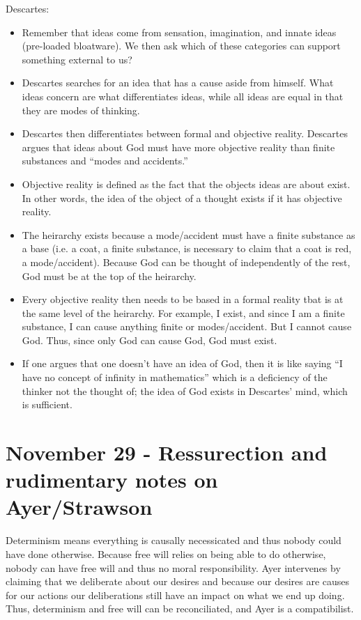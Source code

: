 \documentclass{report}
\begin{document}
Descartes:

\begin{itemize}
\item Remember that ideas come from sensation, imagination, and innate ideas (pre-loaded bloatware). We then ask which of these categories can support something external to us?
\item Descartes searches for an idea that has a cause aside from himself. What ideas concern are what differentiates ideas, while all ideas are equal in that they are modes of thinking.
\item Descartes then differentiates between formal and objective reality. Descartes argues that ideas about God must have more objective reality than finite substances and ``modes and accidents.''
\item Objective reality is defined as the fact that the objects ideas are about exist. In other words, the idea of the object of a thought exists if it has objective reality.
\item The heirarchy exists because a mode/accident must have a finite substance as a base (i.e. a coat, a finite substance, is necessary to claim that a coat is red, a mode/accident). Because God can be thought of independently of the rest, God must be at the top of the heirarchy.
\item Every objective reality then needs to be based in a formal reality tbat is at the same level of the heirarchy. For example, I exist, and since I am a finite substance, I can cause anything finite or modes/accident. But I cannot cause God. Thus, since only God can cause God, God must exist. 
\item If one argues that one doesn't have an idea of God, then it is like saying ``I have no concept of infinity in mathematics'' which is a deficiency of the thinker not the thought of; the idea of God exists in Descartes' mind, which is sufficient. 
\end{itemize}

\section{November 29 - Ressurection and rudimentary notes on Ayer/Strawson}

Determinism means everything is causally necessicated and thus nobody could have done otherwise. Because free will relies on being able to do otherwise, nobody can have free will and thus no moral responsibility. Ayer intervenes by claiming that we deliberate about our desires and because our desires are causes for our actions our deliberations still have an impact on what we end up doing. Thus, determinism and free will can be reconciliated, and Ayer is a compatibilist.
\end{document}
